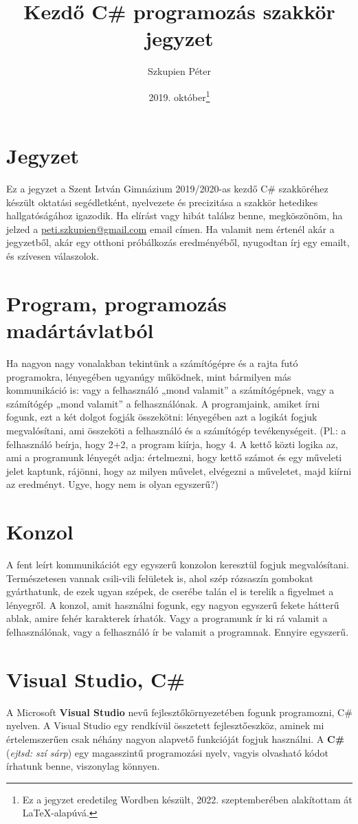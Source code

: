 \documentclass[a4paper]{article}
\title{Kezdő C\# programozás szakkör jegyzet}
\author{Szkupien Péter}
\date{2019. október\footnote{Ez a jegyzet eredetileg Wordben készült, 2022. szeptemberében alakítottam át \LaTeX-alapúvá.}}
\begin{document}
	\maketitle
	
	\section{Jegyzet}
	Ez a jegyzet a Szent István Gimnázium 2019/2020-as kezdő C\# szakköréhez készült oktatási segédletként, nyelvezete és precizitása a szakkör hetedikes hallgatóságához igazodik. Ha elírást vagy hibát találsz benne, megköszönöm, ha jelzed a \href{mailto:peti.szkupien@gmail.com}{peti.szkupien@gmail.com} email címen. Ha valamit nem értenél akár a jegyzetből, akár egy otthoni próbálkozás eredményéből, nyugodtan írj egy emailt, és szívesen válaszolok.
	
	\section{Program, programozás madártávlatból}
	Ha nagyon nagy vonalakban tekintünk a számítógépre és a rajta futó programokra, lényegében ugyanúgy működnek, mint bármilyen más kommunikáció is: vagy a felhasználó „mond valamit” a számítógépnek, vagy a számítógép „mond valamit” a felhasználónak. A programjaink, amiket írni fogunk, ezt a két dolgot fogják összekötni: lényegében azt a logikát fogjuk megvalósítani, ami összeköti a felhasználó és a számítógép tevékenységeit. (Pl.: a felhasználó beírja, hogy 2+2, a program kiírja, hogy 4. A kettő közti logika az, ami a programunk lényegét adja: értelmezni, hogy kettő számot és egy műveleti jelet kaptunk, rájönni, hogy az milyen művelet, elvégezni a műveletet, majd kiírni az eredményt. Ugye, hogy nem is olyan egyszerű?)
	
	\section{Konzol}
	A fent leírt kommunikációt egy egyszerű konzolon keresztül fogjuk megvalósítani. Természetesen vannak csili-vili felületek is, ahol szép rózsaszín gombokat gyárthatunk, de ezek ugyan szépek, de cserébe talán el is terelik a figyelmet a lényegről. A konzol, amit használni fogunk, egy nagyon egyszerű fekete hátterű ablak, amire fehér karakterek írhatók. Vagy a programunk ír ki rá valamit a felhasználónak, vagy a felhasználó ír be valamit a programnak. Ennyire egyszerű.
	
	\section{Visual Studio, C\#}
	A Microsoft \textbf{Visual Studio} nevű fejlesztőkörnyezetében fogunk programozni, C\# nyelven. A Visual Studio egy rendkívül összetett fejlesztőeszköz, aminek mi értelemszerűen csak néhány nagyon alapvető funkcióját fogjuk használni. A \textbf{C\#} (\emph{ejtsd: szí sárp}) egy magasszintű programozási nyelv, vagyis olvasható kódot írhatunk benne, viszonylag könnyen.
	
\end{document}
